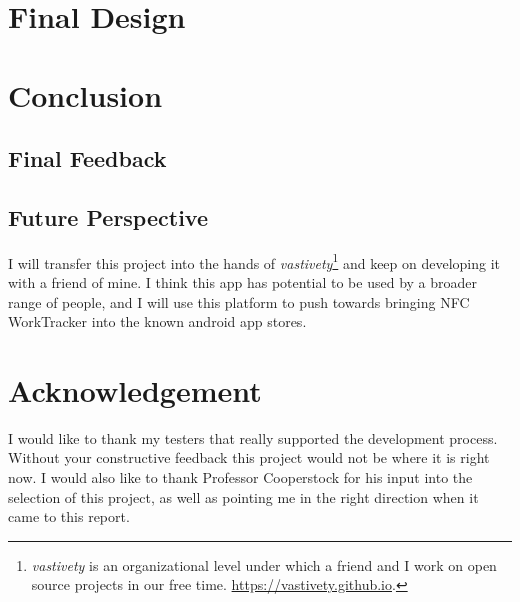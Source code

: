 \documentclass[conference]{IEEEtran}
\newcommand{\projectname}{NFC WorkTracker}
\begin{document}
\section{Final Design}

\section{Conclusion}

\subsection{Final Feedback}

\subsection{Future Perspective}
I will transfer this project into the hands of \textit{vastivety}\footnote{\textit{vastivety} is an organizational level under which a friend and I work on open source projects in our free time. \url{https://vastivety.github.io}.} and keep on developing it with a friend of mine. I think this app has potential to be used by a broader range of people, and I will use this platform to push towards bringing {\projectname} into the known android app stores.

\section*{Acknowledgement}
I would like to thank my testers that really supported the development process. Without your constructive feedback this project would not be where it is right now. I would also like to thank Professor Cooperstock for his input into the selection of this project, as well as pointing me in the right direction when it came to this report.




\end{document}
